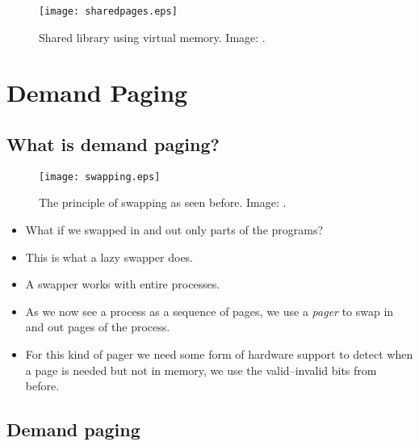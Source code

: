 \documentclass{beamer}
\begin{document}
\begin{frame}{\insertsubsectionhead}
  \begin{figure}
    \texttt{[image: sharedpages.eps]}
    \caption{Shared library using virtual memory.
      Image: \cite{Silberschatz2013osc}.}
  \end{figure}
\end{frame}


\section{Demand Paging}

\subsection{What is demand paging?}

\begin{frame}{\insertsubsectionhead}
  \begin{figure}
    \texttt{[image: swapping.eps]}
    \caption{The principle of swapping as seen before.
      Image: \cite{Silberschatz2013osc}.}
  \end{figure}
\end{frame}

\begin{frame}{\insertsubsectionhead}
  \begin{itemize}
    \item What if we swapped in and out only parts of the programs?

    \item This is what a lazy swapper does.

    \item A swapper works with entire processes.

    \item As we now see a process as a sequence of pages, we use a \emph{pager} 
      to swap in and out pages of the process.

    \item For this kind of pager we need some form of hardware support to 
      detect when a page is needed but not in memory, we use the valid--invalid 
      bits from before.

  \end{itemize}
\end{frame}

\subsection{Demand paging}
\end{document}
